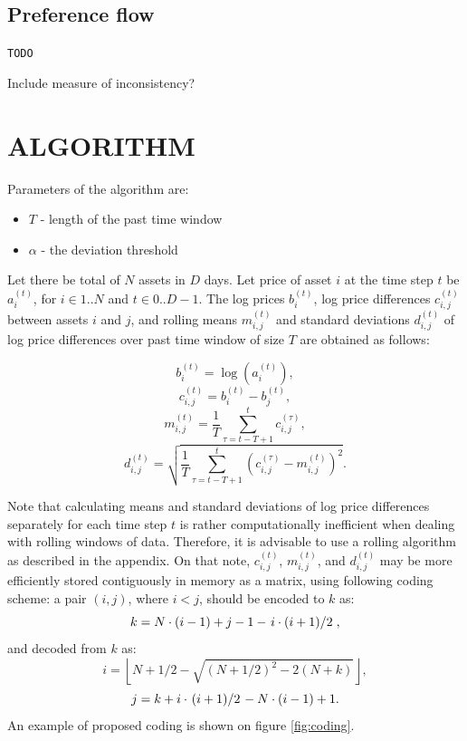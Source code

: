 \documentclass[letterpaper, 10 pt, conference]{ieeeconf}
\begin{document}
  \subsection{Preference flow}
  
  \verb|TODO| 
  
  Include measure of inconsistency?
    
  \section{ALGORITHM} 
  
  Parameters of the algorithm are:
  \begin{itemize}
    \item $T$ - length of the past time window
    \item $\alpha$ - the deviation threshold
  \end{itemize}
  
  Let there be total of $N$ assets in $D$ days.
  Let price of asset $i$ at the time step $t$ be $a_i^{(t)}$, for $i \in 1..N$ and $t \in 0..D-1$.
  The log prices $b_i^{(t)}$, log price differences $c_{i,j}^{(t)}$ between assets $i$ and $j$, and rolling means $m_{i,j}^{(t)}$ and standard deviations $d_{i,j}^{(t)}$ of log price differences over past time window of size $T$ are obtained as follows:
  
  \begin{equation} b_i^{(t)} = \log\left(a_i^{(t)}\right), \end{equation}
  \begin{equation} c_{i,j}^{(t)} = b_i^{(t)} - b_j^{(t)}, \end{equation}
  \begin{equation} m_{i,j}^{(t)} = \frac{1}{T}\sum_{\tau=t-T+1}^{t} c_{i,j}^{(\tau)} \label{eq:m}, \end{equation}
  \begin{equation} d_{i,j}^{(t)} = \sqrt{\frac{1}{T}\sum_{\tau=t-T+1}^{t} \left(c_{i,j}^{(\tau)} - m_{i,j}^{(t)} \right)^2} \label{eq:d}. \end{equation}
  
  Note that calculating means and standard deviations of log price differences separately for each time step $t$ is rather computationally inefficient when dealing with rolling windows of data.
  Therefore, it is advisable to use a rolling algorithm as described in the appendix.
  On that note, $c_{i,j}^{(t)}$, $m_{i,j}^{(t)}$, and $d_{i,j}^{(t)}$ may be more efficiently stored contiguously in memory as a matrix, using following coding scheme: a pair $(i, j)$, where $i < j$, should be encoded to $k$ as:
  \begin{equation} k = N \cdot (i - 1) + j - 1 - \left. i \cdot (i + 1) \middle/ 2\right., \end{equation}
  and decoded from $k$ as:
  \begin{equation} i = \left\lfloor N + 1/2 - \sqrt{(N + 1/2)^2 - 2(N + k)} \right\rfloor, \end{equation}
  \begin{equation} j = k + i \cdot \left.(i + 1) \middle/ 2\right. - N \cdot (i - 1) + 1. \end{equation}
  An example of proposed coding is shown on figure \ref{fig:coding}.
  
\end{document}

